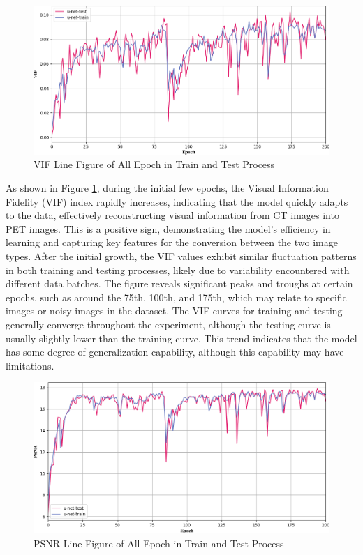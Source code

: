 \documentclass[twocolumn]{article}
\begin{document}
\begin{figure}[h]
	\centering
	\includegraphics[width=1.0\linewidth]{u-net/VIF}
	\caption[vif]{VIF Line Figure of All Epoch in Train and Test Process}
	\label{fig:vif}
\end{figure}

As shown in Figure \ref{fig:vif}, during the initial few epochs, the Visual Information Fidelity (VIF) index rapidly increases, indicating that the model quickly adapts to the data, effectively reconstructing visual information from CT images into PET images. This is a positive sign, demonstrating the model's efficiency in learning and capturing key features for the conversion between the two image types. After the initial growth, the VIF values exhibit similar fluctuation patterns in both training and testing processes, likely due to variability encountered with different data batches. The figure reveals significant peaks and troughs at certain epochs, such as around the 75th, 100th, and 175th, which may relate to specific images or noisy images in the dataset. The VIF curves for training and testing generally converge throughout the experiment, although the testing curve is usually slightly lower than the training curve. This trend indicates that the model has some degree of generalization capability, although this capability may have limitations.

\begin{figure}[h]
	\centering
	\includegraphics[width=1.0\linewidth]{u-net/PSNR}
	\caption[psnr]{PSNR Line Figure of All Epoch in Train and Test Process}
	\label{fig:psnr}
\end{figure}
\end{document}
